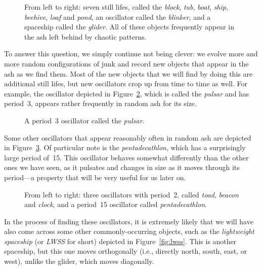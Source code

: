 \begin{figure}[!htb]
	\centering{}
	\caption{From left to right: seven still lifes, called the \emph{block}, \emph{tub}, \emph{boat}, \emph{ship}, \emph{beehive}, \emph{loaf} and \emph{pond}, an oscillator called the \emph{blinker}, and a spaceship called the \emph{glider}. All of these objects frequently appear in the ash left behind by chaotic patterns.}\label{fig:first_objects}
\end{figure}

To answer this question, we simply continue not being clever: we evolve more and more random configurations of junk and record new objects that appear in the ash as we find them. Most of the new objects that we will find by doing this are additional still lifes, but new oscillators crop up from time to time as well. For example, the oscillator depicted in Figure~\ref{fig:pulsar}, which is called the \emph{pulsar} and has period~$3$, appears rather frequently in random ash for its size.

\begin{figure}[!htb]
	\centering
	\caption{A period~3 oscillator called the \emph{pulsar}.}\label{fig:pulsar}
\end{figure}

Some other oscillators that appear reasonably often in random ash are depicted in Figure~\ref{fig:random_oscillators}. Of particular note is the \emph{pentadecathlon}, which has a surprisingly large period of~15. This oscillator behaves somewhat differently than the other ones we have seen, as it pulsates and changes in size as it moves through its period---a property that will be very useful for us later on.

\begin{figure}[!htb]
	\centering{}
	\caption{From left to right: three oscillators with period~2, called \emph{toad}, \emph{beacon} and \emph{clock}, and a period~15 oscillator called \emph{pentadecathlon}.}\label{fig:random_oscillators}
\end{figure}

In the process of finding these oscillators, it is extremely likely that we will have also come across some other commonly-occurring objects, such as the \emph{lightweight spaceship} (or \emph{LWSS} for short) depicted in Figure~\ref{fig:lwss}. This is another spaceship, but this one moves orthogonally (i.e., directly north, south, east, or west), unlike the glider, which moves diagonally.

